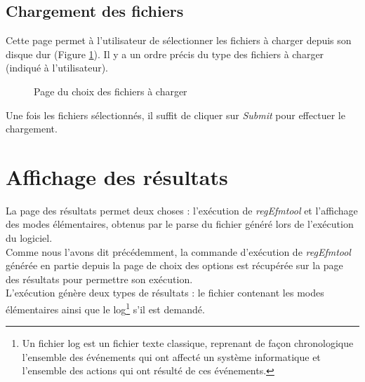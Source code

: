 \subsection{Chargement des fichiers}
Cette page permet à l'utilisateur de sélectionner les fichiers à charger depuis son disque dur (Figure \ref{chargement2}). Il y a un ordre précis du type des fichiers à charger (indiqué à l'utilisateur). 

\begin{figure}[!ht]
	\begin{center}
		\caption{Page du choix des fichiers à charger}
  		\label{chargement2}
  	\end{center}	
\end{figure}

Une fois les fichiers sélectionnés, il suffit de cliquer sur \textit{Submit} pour effectuer le chargement.

\section{Affichage des résultats}

La page des résultats permet deux choses : l'exécution de \textit{regEfmtool} et l'affichage des modes élémentaires, obtenus par le parse du fichier généré lors de l'exécution du logiciel.\\

Comme nous l'avons dit précédemment, la commande d'exécution de \textit{regEfmtool} générée en partie depuis la page de choix des options est récupérée sur la page des résultats pour permettre son exécution.\\
L'exécution génère deux types de résultats : le fichier contenant les modes élémentaires ainsi que le log\footnote{Un fichier log est un fichier texte classique, reprenant de façon chronologique l'ensemble des événements qui ont affecté un système informatique et l'ensemble des actions qui ont résulté de ces événements.} s'il est demandé.\\ 

